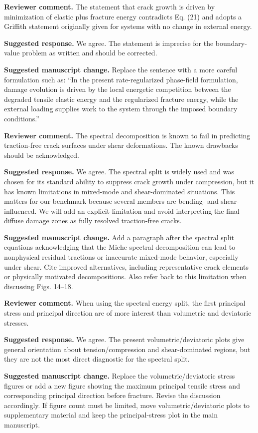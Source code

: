 \documentclass[11pt,a4paper]{article}
\newcommand{\comment}[1]{\par\noindent\textbf{Reviewer comment.} #1\par}
\newcommand{\response}[1]{\par\noindent\textbf{Suggested response.} #1\par}
\newcommand{\change}[1]{\par\noindent\textbf{Suggested manuscript change.} #1\par}
\begin{document}
\comment{The statement that crack growth is driven by minimization of elastic
plus fracture energy contradicts Eq. (21) and adopts a Griffith statement
originally given for systems with no change in external energy.}

\response{We agree. The statement is imprecise for the boundary-value problem
as written and should be corrected.}

\change{Replace the sentence with a more careful formulation such as:
``In the present rate-regularized phase-field formulation, damage evolution is
driven by the local energetic competition between the degraded tensile elastic
energy and the regularized fracture energy, while the external loading supplies
work to the system through the imposed boundary conditions.''}

\comment{The spectral decomposition is known to fail in predicting traction-free
crack surfaces under shear deformations. The known drawbacks should be
acknowledged.}

\response{We agree. The spectral split is widely used and was chosen for its
standard ability to suppress crack growth under compression, but it has known
limitations in mixed-mode and shear-dominated situations. This matters for our
benchmark because several members are bending- and shear-influenced. We will
add an explicit limitation and avoid interpreting the final diffuse damage zones
as fully resolved traction-free cracks.}

\change{Add a paragraph after the spectral split equations acknowledging that
the Miehe spectral decomposition can lead to nonphysical residual tractions or
inaccurate mixed-mode behavior, especially under shear. Cite improved
alternatives, including representative crack elements or physically motivated
decompositions. Also refer back to this limitation when discussing Figs. 14--18.}

\comment{When using the spectral energy split, the first principal stress and
principal direction are of more interest than volumetric and deviatoric
stresses.}

\response{We agree. The present volumetric/deviatoric plots give general
orientation about tension/compression and shear-dominated regions, but they are
not the most direct diagnostic for the spectral split.}

\change{Replace the volumetric/deviatoric stress figures or add a new figure
showing the maximum principal tensile stress and corresponding principal
direction before fracture. Revise the discussion accordingly. If figure count
must be limited, move volumetric/deviatoric plots to supplementary material and
keep the principal-stress plot in the main manuscript.}
\end{document}
